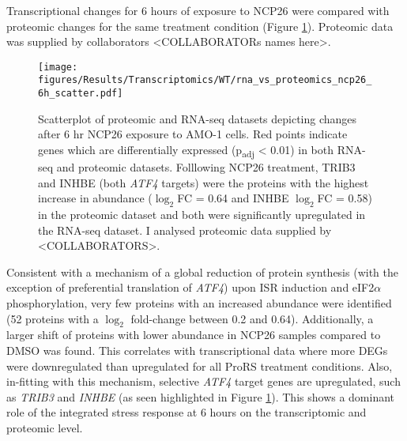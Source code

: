 Transcriptional changes for 6 hours of exposure to NCP26 were compared with proteomic changes for the same treatment condition (Figure \ref{fig:proteomic_rna_scatter}).
Proteomic data was supplied by collaborators <COLLABORATORs names here>.
\begin{figure}[htb]
\centering
\texttt{[image: figures/Results/Transcriptomics/WT/rna\_vs\_proteomics\_ncp26\_6h\_scatter.pdf]}
\caption[]{Scatterplot of proteomic and RNA-seq datasets depicting changes after 6 hr NCP26 exposure to AMO-1 cells.
Red points indicate genes which are differentially expressed (p\textsubscript{adj} < 0.01) in both RNA-seq and proteomic datasets.
Folllowing NCP26 treatment, TRIB3 and INHBE (both \textit{ATF4} targets) were the proteins with the highest increase in abundance ($\log_{2}$FC = 0.64 and INHBE  $\log_{2}$FC = 0.58) in the proteomic dataset and both were significantly upregulated in the RNA-seq dataset.
I analysed proteomic data supplied by <COLLABORATORS>.
}
\label{fig:proteomic_rna_scatter}
\end{figure}
%
Consistent with a mechanism of a global reduction of protein synthesis (with the exception of preferential translation of \textit{ATF4}) upon  ISR induction and eIF2$\alpha$ phosphorylation, very few proteins with an increased abundance were identified (52 proteins with a $\log_{2}$ fold-change between 0.2 and 0.64).
Additionally, a larger shift of proteins with lower abundance in NCP26 samples compared to DMSO was found.
This correlates with transcriptional data where more DEGs were downregulated than upregulated for all ProRS treatment conditions.
Also, in-fitting with this mechanism, selective \textit{ATF4} target genes are upregulated, such as \textit{TRIB3} and \textit{INHBE} (as seen highlighted in Figure \ref{fig:proteomic_rna_scatter}).
This shows a dominant role of the integrated stress response at 6 hours on the transcriptomic and proteomic level.



